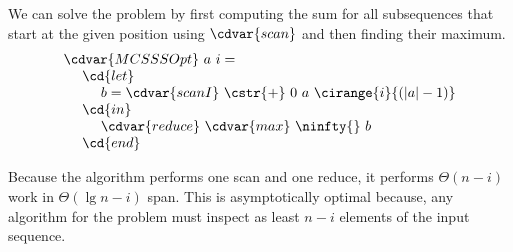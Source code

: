 \begin{cluster}
\label{grp:alg:mcss::reduction::mcsss}

\begin{algorithm}
\label{alg:mcss::reduction::mcsss}
We can solve the \MCSSS{} problem by first computing the sum for all
subsequences that start at the given position using $\cdvar{scan}$ and then finding
their maximum.
\[
\begin{array}{l}
\cdvar{MCSSSOpt}~a~i =
\\ 
~~~~\cd{let} 
\\ 
~~~~~~~~b = \cdvar{scanI}~\cstr{+}~0~a~\cirange{i}{(|a|-1)}
\\ 
~~~~\cd{in}
\\ 
~~~~~~~~\cdvar{reduce}~\cdvar{max}~\ninfty{}~b
\\ 
~~~~\cd{end}
\end{array}
\]

Because the algorithm performs one scan and one reduce, it performs
$\Theta(n-i)$ work in $\Theta(\lg{n-i})$ span.  This is asymptotically
optimal because, any algorithm for the \MCSSS{} problem must inspect
as least $n-i$ elements of the input sequence.

\end{algorithm}
\end{cluster}

